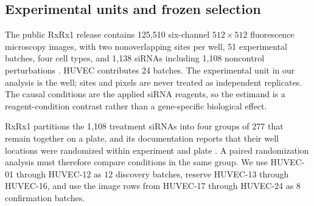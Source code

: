 \documentclass[11pt]{article}
\theoremstyle{definition}
\theoremstyle{remark}
\newcommand{\1}{\mathbf 1}
\providecommand{\RxDiscoveryBatches}{12}
\providecommand{\RxConfirmationBatches}{8}
\begin{document}
\subsection{Experimental units and frozen selection}

The public RxRx1 release contains 125,510 six-channel \(512\times512\)
fluorescence microscopy images, with two nonoverlapping sites per well, 51
experimental batches, four cell types, and 1,138 siRNAs including 1,108
noncontrol perturbations \citep{sypetkowski2023rxrx1,rxrx1website}.  HUVEC
contributes 24 batches.  The experimental unit in our analysis is the well;
sites and pixels are never treated as independent replicates.  The causal
conditions are the applied siRNA reagents, so the estimand is a
reagent-condition contrast rather than a gene-specific biological effect.

RxRx1 partitions the 1,108 treatment siRNAs into four groups of 277 that
remain together on a plate, and its documentation reports that their well
locations were randomized within experiment and plate
\citep{sypetkowski2023rxrx1}.  A paired randomization analysis must
therefore compare conditions in the same group.  We use HUVEC-01 through
HUVEC-12 as \(\RxDiscoveryBatches\) discovery batches, reserve HUVEC-13 through
HUVEC-16, and use the image rows from HUVEC-17 through HUVEC-24 as
\(\RxConfirmationBatches\) confirmation batches.
\end{document}
